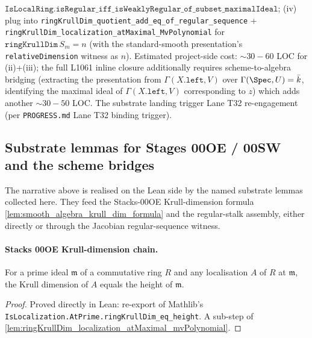 \(\texttt{IsLocalRing.isRegular\_iff\_isWeaklyRegular\_of\_subset\_maximalIdeal}\);
(iv) plug into \texttt{ringKrullDim\_quotient\_add\_eq\_of\_regular\_sequence}
+ \texttt{ringKrullDim\_localization\_atMaximal\_MvPolynomial} for
\(\texttt{ringKrullDim}\,S_{m} = n\) (with the standard-smooth
presentation's \texttt{relativeDimension} witness as \(n\)). Estimated
project-side cost: \(\sim 30-60\) LOC for (ii)+(iii); the full L1061
inline closure additionally requires scheme-to-algebra bridging
(extracting the presentation from
\(\Gamma(X.\texttt{left}, V)\) over \(\Gamma(\Spec, U) = \bar k\),
identifying the maximal ideal of \(\Gamma(X.\texttt{left}, V)\)
corresponding to \(z\)) which adds another \(\sim 30-50\) LOC. The
substrate landing trigger Lane T32 re-engagement (per
\texttt{PROGRESS.md} Lane T32 binding trigger).

\subsection{Substrate lemmas for Stages 00OE / 00SW and the scheme bridges}
\label{subsec:codim1_substrate_lemmas}

The narrative above is realised on the Lean side by the named substrate lemmas
collected here. They feed the Stacks-00OE Krull-dimension formula
\cref{lem:smooth_algebra_krull_dim_formula} and the regular-stalk assembly,
either directly or through the Jacobian regular-sequence witness.

\paragraph{Stacks 00OE Krull-dimension chain.}

\begin{lemma}
  \label{lem:ringKrullDim_localization_eq_height_atPrime}
  For a prime ideal \(\mathfrak m\) of a commutative ring \(R\) and any localisation
  \(A\) of \(R\) at \(\mathfrak m\), the Krull dimension of \(A\) equals the height of
  \(\mathfrak m\).
\end{lemma}

\begin{proof}
  Proved directly in Lean: re-export of Mathlib's
  \texttt{IsLocalization.AtPrime.ringKrullDim\_eq\_height}. A sub-step of
  \cref{lem:ringKrullDim_localization_atMaximal_mvPolynomial}.
\end{proof}

